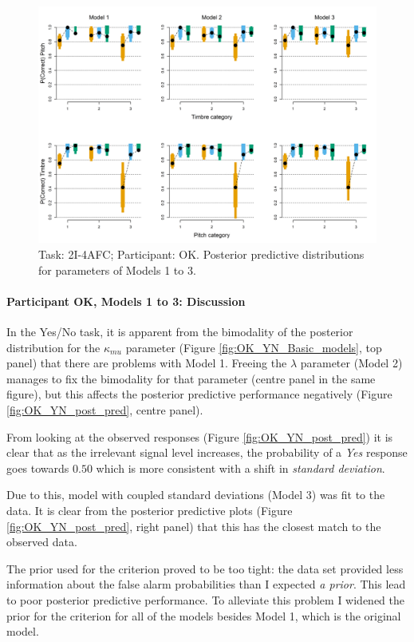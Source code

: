 \documentclass{article}\usepackage{knitr}
\begin{document}
\begin{figure}[H]
\centering
\includegraphics[scale=0.75, angle = 270]{Analysis_of_Human_Data/OK_AFC_post_pred}
\caption{Task: 2I-4AFC; Participant: OK. Posterior predictive distributions for parameters of Models 1 to 3.}
\label{fig:OK_AFC_post_pred}
\end{figure}

\paragraph{Participant OK, Models 1 to 3: Discussion}

In the Yes/No task, it is apparent from the bimodality of the posterior distribution for the $\kappa_{mu}$ parameter (Figure \ref{fig:OK_YN_Basic_models}, top panel) that there are problems with Model 1. Freeing the $\lambda$ parameter (Model 2) manages to fix the bimodality for that parameter (centre panel in the same figure), but this affects the posterior predictive performance negatively (Figure \ref{fig:OK_YN_post_pred}, centre panel). 

From looking at the observed responses (Figure \ref{fig:OK_YN_post_pred}) it is clear that as the irrelevant signal level increases, the probability of a \textit{Yes} response goes towards $0.50$ which is more consistent with a shift in \textit{standard deviation}. 

Due to this, model with coupled standard deviations (Model 3) was fit to the data. It is clear from the posterior predictive plots (Figure \ref{fig:OK_YN_post_pred}, right panel) that this has the closest match to the observed data.

The prior used for the criterion proved to be too tight: the data set provided less information about the false alarm probabilities than I expected \textit{a prior}. This lead to poor posterior predictive performance. To alleviate this problem I widened the prior for the criterion for all of the models besides Model 1, which is the original model.
\end{document}
